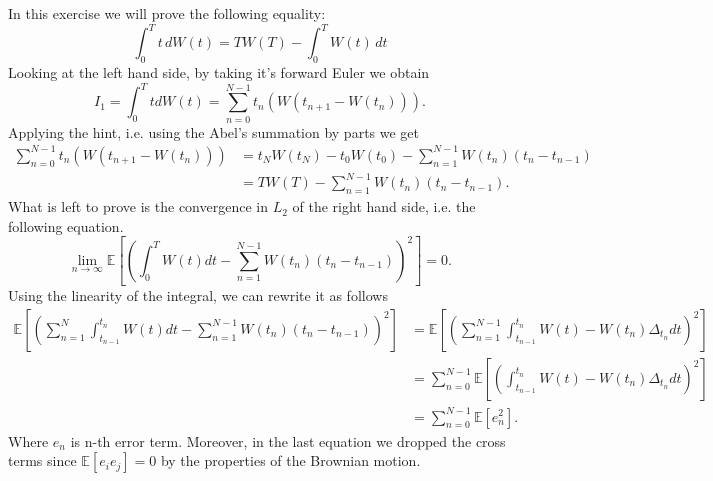 \documentclass[a4paper,12pt]{article} %
\begin{document}
\subsection{}
In this exercise we will prove the following equality:
\begin{equation}
    \int_0^T t \, dW(t) = T W(T) - \int_0^T W(t) \, dt
\end{equation}
Looking at the left hand side, by taking it's forward Euler we obtain
\begin{equation}
    I_1 = \int _0^T t dW(t) = \sum_{n=0}^{N-1} t_n (W(t_{n+1} -W(t_n) )).
\end{equation}
Applying the hint, i.e. using the Abel's summation by parts we get
\begin{align*}
    \sum_{n=0}^{N-1} t_n (W(t_{n+1} -W(t_n) )) & = t_N W(t_N) - t_0 W(t_0) - \sum_{n=1}^{N-1} W(t_n) (t_n - t_{n-1}) \\
                                               & = T W(T)  - \sum_{n=1}^{N-1} W(t_n) (t_n - t_{n-1}).
\end{align*}
What is left to prove is the convergence in \(L_2\) of the right hand side, i.e. the following equation.
\begin{equation}
    \lim_{n \to \infty} \mathbb{E} \left[ \left(   \int _0^T W(t)dt-\sum_{n=1}^{N-1} W(t_n) (t_n - t_{n-1})  \right)^2\right] =0.
\end{equation}
Using the linearity of the integral, we can rewrite it as follows
\begin{align*}
    \mathbb{E} \left[ \left( \sum_{n=1}^{N}  \int _{t_{n-1}}^{t_n} W(t)dt-\sum_{n=1}^{N-1} W(t_n) (t_n - t_{n-1}) \right) ^2  \right] & = \mathbb{E} \left[ \left(   \sum_{n=1}^{N-1}  \int _{t_{n-1}}^{t_n} W(t)-W(t_n)\Delta _{t_n}dt  \right)^2 \right] \\
                                                                                                                                      & =\sum_{n=0}^{N-1} \mathbb{E} \left[ \left(     \int _{t_{n-1}}^{t_n} W(t)-W(t_n)\Delta _{t_n} dt \right)^2\right]  \\
                                                                                                                                      & = \sum_{n=0}^{N-1} \mathbb{E} \left[  e_n ^2 \right].
\end{align*}
Where \(e_n\) is n-th error term. Moreover, in the last equation we dropped the cross terms  since \(\mathbb{E} \left[ e_i e_j \right] = 0 \) by the properties of the Brownian motion.
\end{document}

